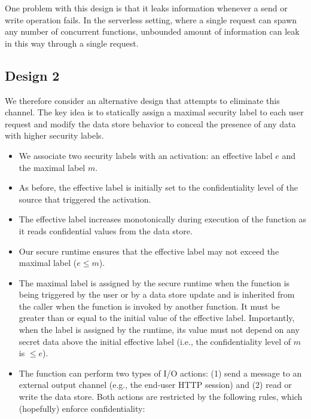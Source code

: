 \documentclass[acmsmall,10pt,review,anonymous]{acmart}\settopmatter{printfolios=true}
\begin{document}
One problem with this design is that it leaks information whenever a 
send or write operation fails.  In the serverless setting, where a 
single request can spawn any number of concurrent functions, unbounded 
amount of information can leak in this way through a single request.

\subsection{Design 2}

We therefore consider an alternative design that attempts to eliminate 
this channel. The key idea is to statically assign a maximal security 
label to each user request and modify the data store behavior to 
conceal the presence of any data with higher security labels.

\begin{itemize}
    \item We associate two security labels with an activation: an 
        effective label $e$ and the maximal label $m$.

    \item As before, the effective label is initially set to the 
        confidentiality level of the source that triggered the 
        activation.

    \item The effective label increases monotonically during execution 
        of the function as it reads confidential values from the data 
        store.

    \item Our secure runtime ensures that the effective label may not 
        exceed the maximal label ($e \leq m$).

    \item The maximal label is assigned by the secure runtime when the 
        function is being triggered by the user or by a data store 
        update and is inherited from the caller when the function is 
        invoked by another function. It must be greater than or equal 
        to the initial value of the effective label.  Importantly, 
        when the label is assigned by the runtime, its value must not 
        depend on any secret data above the initial effective label 
        (i.e., the confidentiality level of $m$ is $\leq e$).

    \item The function can perform two types of I/O actions: (1) send 
        a message to an external output channel (e.g., the end-user 
        HTTP session) and (2) read or write the data store.  Both 
        actions are restricted by the following rules, which 
        (hopefully) enforce confidentiality:


\end{itemize}
\end{document}
